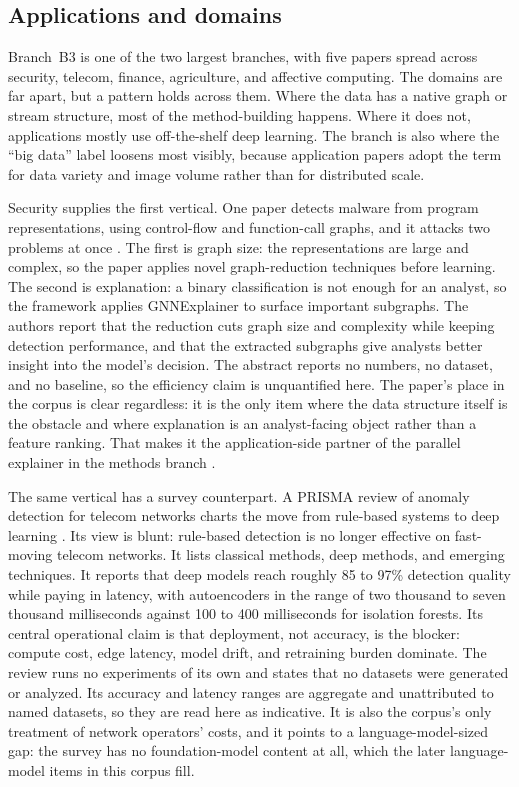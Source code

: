 \documentclass[pdflatex,sn-basic,Numbered]{sn-jnl}%
\begin{document}
\subsection{Applications and domains}\label{subsec25}

Branch~B3 is one of the two largest branches, with five papers spread across security, telecom, finance, agriculture, and affective computing. The domains are far apart, but a pattern holds across them. Where the data has a native graph or stream structure, most of the method-building happens. Where it does not, applications mostly use off-the-shelf deep learning. The branch is also where the ``big data'' label loosens most visibly, because application papers adopt the term for data variety and image volume rather than for distributed scale.

Security supplies the first vertical. One paper detects malware from program representations, using control-flow and function-call graphs, and it attacks two problems at once \citep{mohammadian2025explainable}. The first is graph size: the representations are large and complex, so the paper applies novel graph-reduction techniques before learning. The second is explanation: a binary classification is not enough for an analyst, so the framework applies GNNExplainer to surface important subgraphs. The authors report that the reduction cuts graph size and complexity while keeping detection performance, and that the extracted subgraphs give analysts better insight into the model's decision. The abstract reports no numbers, no dataset, and no baseline, so the efficiency claim is unquantified here. The paper's place in the corpus is clear regardless: it is the only item where the data structure itself is the obstacle and where explanation is an analyst-facing object rather than a feature ranking. That makes it the application-side partner of the parallel explainer in the methods branch \citep{jiang2026pexp}.

The same vertical has a survey counterpart. A PRISMA review of anomaly detection for telecom networks charts the move from rule-based systems to deep learning \citep{edozie2025telecom}. Its view is blunt: rule-based detection is no longer effective on fast-moving telecom networks. It lists classical methods, deep methods, and emerging techniques. It reports that deep models reach roughly 85 to 97\% detection quality while paying in latency, with autoencoders in the range of two thousand to seven thousand milliseconds against 100 to 400 milliseconds for isolation forests. Its central operational claim is that deployment, not accuracy, is the blocker: compute cost, edge latency, model drift, and retraining burden dominate. The review runs no experiments of its own and states that no datasets were generated or analyzed. Its accuracy and latency ranges are aggregate and unattributed to named datasets, so they are read here as indicative. It is also the corpus's only treatment of network operators' costs, and it points to a language-model-sized gap: the survey has no foundation-model content at all, which the later language-model items in this corpus fill.
\end{document}
